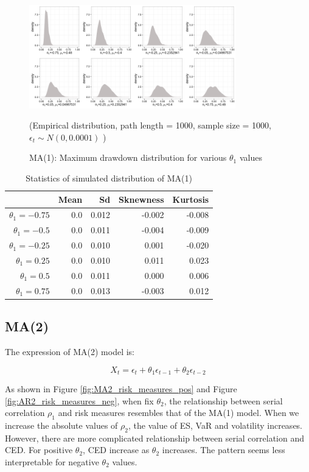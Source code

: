 \documentclass[11pt]{article}
\begin{document}
\begin{figure}[H]
\centering
\includegraphics[width = 0.8\textwidth]{../figures/simulation/MA1_maxDrawdown_dist}
\caption{MA(1): Maximum drawdown distribution for various $\theta_1$ values}
(Empirical distribution, path length = 1000, sample size = 1000, $\epsilon_t \sim N(0, 0.0001)$ )
\label{fig:MA1_maxDrawdown_dist}
\end{figure}

\begin{table}[H]
\centering
\begin{tabular}{|r |r r r r|}
\hline
& Mean & Sd & Sknewness & Kurtosis \\
\hline
$\theta_1 = -0.75$ & 0.0 & 0.012 & -0.002 & -0.008\\
$\theta_1 = -0.5$ & 0.0 & 0.011 & -0.004 & -0.009\\
$\theta_1 = -0.25$ & 0.0 &  0.010 &  0.001 & -0.020\\
$\theta_1 = 0.25$ & 0.0 &  0.010 & 0.011 & 0.023\\
$\theta_1 = 0.5$ & 0.0 & 0.011 & 0.000 & 0.006\\
$\theta_1 = 0.75$ & 0.0 & 0.013 & -0.003 & 0.012\\
\hline
\end{tabular}
\caption{Statistics of simulated distribution of MA(1)}
\label{table: MA1_return}
\end{table}

\subsection{MA(2)} %

The expression of MA(2) model is:

\begin{equation}
X_t = \epsilon_t + \theta_1\epsilon_{t-1} + \theta_2\epsilon_{t-2}
\end{equation}

As shown in Figure \ref{fig:MA2_risk_measures_pos} and Figure \ref{fig:AR2_risk_measures_neg}, when fix $\theta_2$, the relationship between serial correlation $\rho_1$ and risk measures resembles that of the MA(1) model. When we increase the absolute values of $\rho_2$, the value of ES, VaR and volatility increases. However, there are more complicated relationship between serial correlation and CED. For positive $\theta_2$, CED increase as $\theta_2$ increases. The pattern seems less interpretable for negative $\theta_2$ values. 
\end{document}
